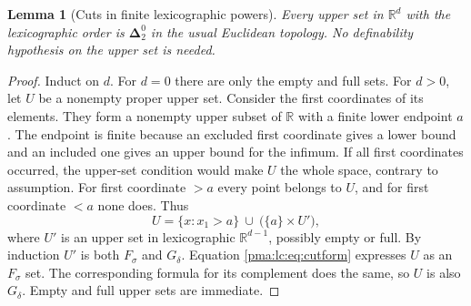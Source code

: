 \documentclass[11pt]{article}
\numberwithin{equation}{section}
\newtheorem{lemma}[lemma]{Lemma}
\theoremstyle{definition}
\theoremstyle{remark}
\newcommand{\R}{\mathbb R}
\newcommand{\Dtwo}{\boldsymbol{\Delta}^{0}_{2}}
\begin{document}
\begin{lemma}[Cuts in finite lexicographic powers]\label{pma:lc:lem:cuts}
Every upper set in $\R^d$ with the lexicographic order is $\Dtwo$ in the
usual Euclidean topology. No definability hypothesis on the upper set is
needed.
\end{lemma}
\begin{proof}
Induct on $d$. For $d=0$ there are only the empty and full sets. For
$d>0$, let $U$ be a nonempty proper upper set. Consider the first
coordinates of its elements. They form a nonempty upper subset of $\R$
with a finite lower endpoint $a$. The endpoint is finite because an
excluded first coordinate gives a lower bound and an included one gives
an upper bound for the infimum. If all first coordinates occurred, the
upper-set condition would make $U$ the whole space, contrary to assumption.
For first coordinate $>a$ every point belongs to $U$, and for first
coordinate $<a$ none does. Thus
\begin{equation}\label{pma:lc:eq:cutform}
 U=\{x:x_1>a\}\ \cup\ \bigl(\{a\}\times U'\bigr),
\end{equation}
where $U'$ is an upper set in lexicographic $\R^{d-1}$, possibly empty or
full. By induction $U'$ is both $F_\sigma$ and $G_\delta$.
Equation \eqref{pma:lc:eq:cutform} expresses $U$ as an $F_\sigma$ set. The
corresponding formula for its complement does the same, so $U$ is also
$G_\delta$. Empty and full upper sets are immediate.
\end{proof}
\end{document}
